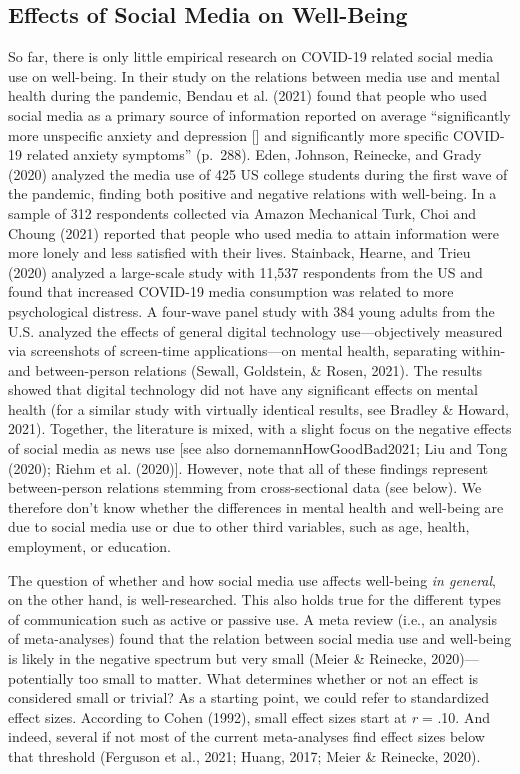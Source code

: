 \documentclass[
  english,
  man,floatsintext]{apa6}
\begin{document}
\hypertarget{effects-of-social-media-on-well-being}{%
\subsection{Effects of Social Media on Well-Being}\label{effects-of-social-media-on-well-being}}

So far, there is only little empirical research on COVID-19 related social media use on well-being.
In their study on the relations between media use and mental health during the pandemic, Bendau et al. (2021) found that people who used social media as a primary source of information reported on average ``significantly more unspecific anxiety and depression {[}{]} and significantly more specific COVID-19 related anxiety symptoms'' (p.~288).
Eden, Johnson, Reinecke, and Grady (2020) analyzed the media use of 425 US college students during the first wave of the pandemic, finding both positive and negative relations with well-being.
In a sample of 312 respondents collected via Amazon Mechanical Turk, Choi and Choung (2021) reported that people who used media to attain information were more lonely and less satisfied with their lives.
Stainback, Hearne, and Trieu (2020) analyzed a large-scale study with 11,537 respondents from the US and found that increased COVID-19 media consumption was related to more psychological distress.
A four-wave panel study with 384 young adults from the U.S. analyzed the effects of general digital technology use---objectively measured via screenshots of screen-time applications---on mental health, separating within- and between-person relations (Sewall, Goldstein, \& Rosen, 2021).
The results showed that digital technology did not have any significant effects on mental health (for a similar study with virtually identical results, see Bradley \& Howard, 2021).
Together, the literature is mixed, with a slight focus on the negative effects of social media as news use {[}see also dornemannHowGoodBad2021; Liu and Tong (2020); Riehm et al. (2020){]}.
However, note that all of these findings represent between-person relations stemming from cross-sectional data (see below).
We therefore don't know whether the differences in mental health and well-being are due to social media use or due to other third variables, such as age, health, employment, or education.

The question of whether and how social media use affects well-being \emph{in general}, on the other hand, is well-researched.
This also holds true for the different types of communication such as active or passive use.
A meta review (i.e., an analysis of meta-analyses) found that the relation between social media use and well-being is likely in the negative spectrum but very small (Meier \& Reinecke, 2020)---potentially too small to matter.
What determines whether or not an effect is considered small or trivial?
As a starting point, we could refer to standardized effect sizes.
According to Cohen (1992), small effect sizes start at \emph{r} = .10.
And indeed, several if not most of the current meta-analyses find effect sizes below that threshold (Ferguson et al., 2021; Huang, 2017; Meier \& Reinecke, 2020).
\end{document}
